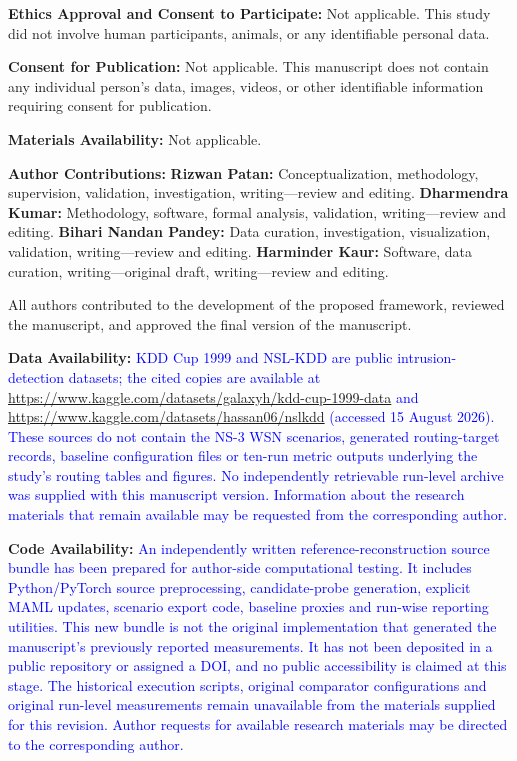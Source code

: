 \documentclass[pdflatex,sn-mathphys-num]{sn-jnl}
\newcommand{\Revised}[1]{\textcolor{blue}{#1}}
\begin{document}
\medskip
\noindent
\textbf{Ethics Approval and Consent to Participate:}
Not applicable. This study did not involve human participants, animals, or any identifiable personal data.

\medskip
\noindent
\textbf{Consent for Publication:}
Not applicable. This manuscript does not contain any individual person's data, images, videos, or other identifiable information requiring consent for publication.

\medskip
\noindent
\textbf{Materials Availability:}
Not applicable.

\medskip
\noindent
\textbf{Author Contributions:}
\textbf{Rizwan Patan:}
Conceptualization, methodology, supervision, validation, investigation, writing---review and editing. \textbf{Dharmendra Kumar:} Methodology, software, formal analysis, validation, writing---review and editing. \textbf{Bihari Nandan Pandey:}
Data curation, investigation, visualization, validation, writing---review and editing. \textbf{Harminder Kaur:}
Software, data curation, writing---original draft, writing---review and editing.

All authors contributed to the development of the proposed framework, reviewed the manuscript, and approved the final version of the manuscript.

\medskip
\noindent
\textbf{Data Availability:}
\Revised{KDD Cup 1999 and NSL-KDD are public intrusion-detection datasets; the cited copies are available at \url{https://www.kaggle.com/datasets/galaxyh/kdd-cup-1999-data} and \url{https://www.kaggle.com/datasets/hassan06/nslkdd} (accessed 15 August 2026). These sources do not contain the NS-3 WSN scenarios, generated routing-target records, baseline configuration files or ten-run metric outputs underlying the study's routing tables and figures. No independently retrievable run-level archive was supplied with this manuscript version. Information about the research materials that remain available may be requested from the corresponding author.}

\medskip
\noindent
\textbf{Code Availability:}
\Revised{An independently written reference-reconstruction source bundle has been prepared for author-side computational testing. It includes Python/PyTorch source preprocessing, candidate-probe generation, explicit MAML updates, scenario export code, baseline proxies and run-wise reporting utilities. This new bundle is not the original implementation that generated the manuscript's previously reported measurements. It has not been deposited in a public repository or assigned a DOI, and no public accessibility is claimed at this stage. The historical execution scripts, original comparator configurations and original run-level measurements remain unavailable from the materials supplied for this revision. Author requests for available research materials may be directed to the corresponding author.}
\end{document}
